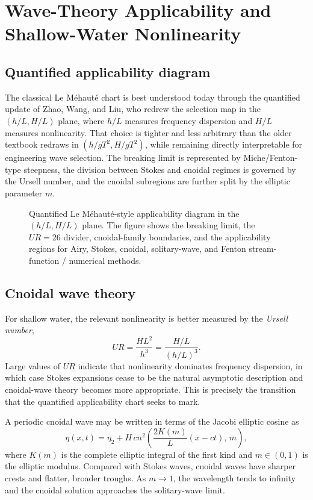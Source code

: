 \documentclass[journal,10pt,twocolumn]{IEEEtran}
\newcommand{\IncludePGF}[2][\linewidth]{%
  \resizebox{#1}{!}{}%
}
\def\mathrm#1{#1}%
\def\;{ }%
\begin{document}
\section{Wave-Theory Applicability and Shallow-Water Nonlinearity}
\label{sec:applicability}

\subsection{Quantified applicability diagram}
The classical Le M\'ehaut\'e chart is best understood today through the quantified update
of Zhao, Wang, and Liu, who redrew the selection map in the
\((h/L,\;H/L)\) plane, where \(h/L\) measures frequency dispersion and \(H/L\) measures
nonlinearity.
That choice is tighter and less arbitrary than the older textbook redraws in
\((h/gT^2,\;H/gT^2)\), while remaining directly interpretable for engineering wave
selection.
The breaking limit is represented by Miche/Fenton-type steepness, the division between
Stokes and cnoidal regimes is governed by the Ursell number, and the cnoidal subregions
are further split by the elliptic parameter \(m\).

\begin{figure}[t]
\centering
\IncludePGF{wave_sim-theories.pgf}
\caption{Quantified Le M\'ehaut\'e-style applicability diagram in the
\((h/L,\;H/L)\) plane.
The figure shows the breaking limit, the \(UR=26\) divider, cnoidal-family
boundaries, and the applicability regions for Airy, Stokes, cnoidal,
solitary-wave, and Fenton stream-function / numerical methods.}
\label{fig:lemehaute}
\end{figure}

\subsection{Cnoidal wave theory}
For shallow water, the relevant nonlinearity is better measured by the
\emph{Ursell number},
\begin{equation}
  UR=\frac{HL^2}{h^3}
  =\frac{H/L}{(h/L)^3}.
\end{equation}
Large values of \(UR\) indicate that nonlinearity dominates frequency dispersion, in
which case Stokes expansions cease to be the natural asymptotic description and
cnoidal-wave theory becomes more appropriate.
This is precisely the transition that the quantified applicability chart seeks to mark.

A periodic cnoidal wave may be written in terms of the Jacobi elliptic cosine as
\begin{equation}
  \eta(x,t)=\eta_2+H\,\mathrm{cn}^2\!\left(
  \frac{2K(m)}{L}(x-ct),\,m\right),
\end{equation}
where \(K(m)\) is the complete elliptic integral of the first kind and \(m\in(0,1)\) is
the elliptic modulus.
Compared with Stokes waves, cnoidal waves have sharper crests and flatter, broader
troughs.
As \(m\to1\), the wavelength tends to infinity and the cnoidal solution approaches the
solitary-wave limit.
\end{document}

